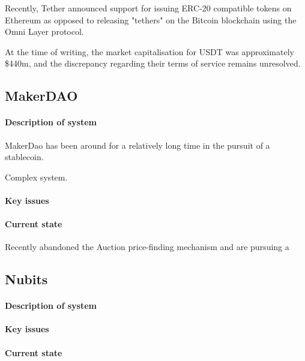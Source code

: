 Recently, Tether announced support for issuing ERC-20 compatible tokens on Ethereum as opposed to releasing "tethers" on the Bitcoin blockchain using the Omni Layer protocol.

At the time of writing, the market capitalisation for USDT was approximately \$440m, and the discrepancy regarding their terms of service remains unresolved.


\subsection{MakerDAO}

\paragraph{Description of system}

MakerDao has been around for a relatively long time in the pursuit of a stablecoin.

Complex system.

\paragraph{Key issues}

\paragraph{Current state}

Recently abandoned the Auction price-finding mechanism and are pursuing a 


\subsection{Nubits}

\paragraph{Description of system}

\paragraph{Key issues}

\paragraph{Current state}

\pagebreak